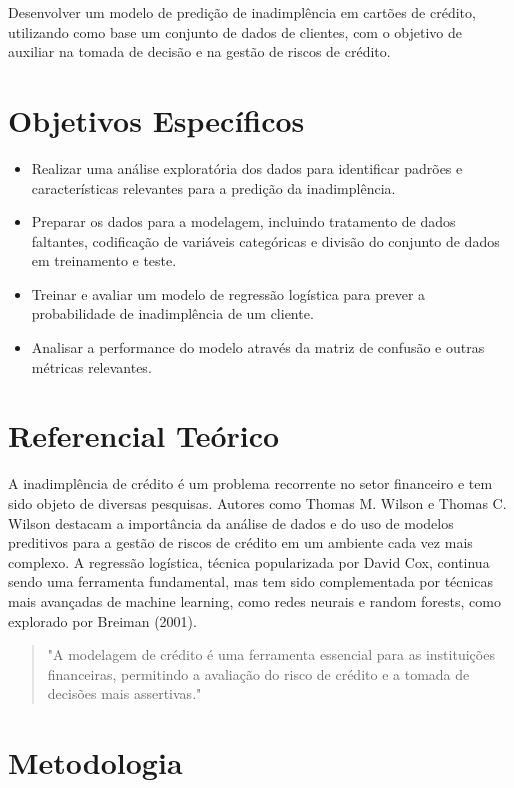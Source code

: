 \documentclass{abntpuc}
\begin{document}
Desenvolver um modelo de predição de inadimplência em cartões de crédito, utilizando como base um conjunto de dados de clientes, com o objetivo de auxiliar na tomada de decisão e na gestão de riscos de crédito.

\section{Objetivos Específicos}

\begin{itemize}
    \item Realizar uma análise exploratória dos dados para identificar padrões e características relevantes para a predição da inadimplência.
    \item Preparar os dados para a modelagem, incluindo tratamento de dados faltantes, codificação de variáveis categóricas e divisão do conjunto de dados em treinamento e teste.
    \item Treinar e avaliar um modelo de regressão logística para prever a probabilidade de inadimplência de um cliente.
    \item Analisar a performance do modelo através da matriz de confusão e outras métricas relevantes.
\end{itemize}

\section{Referencial Teórico}

A inadimplência de crédito é um problema recorrente no setor financeiro e tem sido objeto de diversas pesquisas. Autores como Thomas M. Wilson e Thomas C. Wilson destacam a importância da análise de dados e do uso de modelos preditivos para a gestão de riscos de crédito em um ambiente cada vez mais complexo.
A regressão logística, técnica popularizada por David Cox, continua sendo uma ferramenta fundamental, mas tem sido complementada por técnicas mais avançadas de machine learning, como redes neurais e random forests, como explorado por Breiman (2001).

\begin{quote}
    "A modelagem de crédito é uma ferramenta essencial para as instituições financeiras, permitindo a avaliação do risco de crédito e a tomada de decisões mais assertivas." 
\end{quote}


\section{Metodologia}
\end{document}
